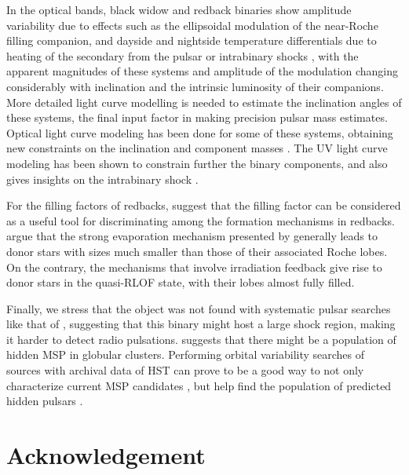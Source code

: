 \documentclass[fleqn,usenatbib,useAMS,letters]{mnras}
\begin{document}
 In the optical bands, black widow and redback binaries show amplitude variability due to effects such as the ellipsoidal modulation of the near-Roche filling companion, and dayside and nightside temperature differentials due to heating of the secondary from the pulsar or intrabinary shocks \cite[e.g.][]{Cho2018}, with the apparent magnitudes of these systems and amplitude of the modulation changing considerably with inclination and the intrinsic luminosity of their companions. More detailed light curve modelling is needed to estimate the inclination angles of these systems, the final input factor in making precision pulsar mass estimates. Optical light curve modeling has been done for some of these systems, obtaining new constraints on the inclination and component masses \citep{Thorstensen2005,LilianaPulsar2018,Cho2018,Strader2019Redbacks}. The UV light curve modeling has been shown to constrain further the binary components, and also gives insights on the intrabinary shock \citep[e.g.,][]{LilianaPulsar2018}.




For the filling factors of redbacks, \cite{devitobenvenuto2020} suggest that the filling factor can be considered as a useful tool for discriminating among the formation mechanisms in redbacks. \cite{devitobenvenuto2020} argue that the strong evaporation mechanism presented by \cite{ChenFormationRedback2013} generally leads to  donor stars with sizes much smaller than those of their associated Roche lobes. On the contrary, the mechanisms that involve irradiation feedback \citep{irradiation2004,Benvenuto2014} give rise to donor stars in the quasi-RLOF state, with their lobes almost fully filled. 


Finally, we stress that the object was not found with systematic pulsar searches like that of  \cite{DamicoU12,damico2001discovery}, suggesting that this binary might host a large shock region, making it harder to detect radio pulsations. \cite{Tavani91} suggests that there might be a population of hidden MSP in globular clusters. Performing orbital variability searches of sources with archival data of HST can prove to be a good way to not only characterize current MSP candidates \citep[e.g.][]{Liliana201847Tuc}, but help find the population of predicted hidden pulsars \citep{CoryPaper,Urquhart20}.



\section{Acknowledgement}
\end{document}

